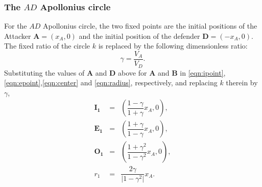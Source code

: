\documentclass{beamer}
\begin{document}
\begin{frame} 
\frametitle{The $AD$ Apollonius circle}
For the $AD$ Apollonius circle, the two fixed points are the initial positions of the Attacker $\boldsymbol{A}=(x_{A},0)$ and the initial position of the defender $\boldsymbol{D}=(-x_{A},0)$. The fixed ratio of the circle $k$ is replaced by the following dimensionless ratio: 
\begin{equation}
\gamma = \dfrac{V_{A}}{V_{D}}.
\end{equation}
Substituting the values of $\boldsymbol{A}$ and $\boldsymbol{D}$ above for $\boldsymbol{A}$ and $\boldsymbol{B}$ in \eqref{eqn:ipoint},\eqref{eqn:epoint},\eqref{eqn:center} and \eqref{eqn:radius}, respectively, and replacing $k$ therein by $\gamma$,
\begin{eqnarray}
\boldsymbol{I_{1}} &=& (\dfrac{1-\gamma}{1+\gamma}x_{A},0),\\
\boldsymbol{E_{1}} &=& (\dfrac{1+\gamma}{1-\gamma}x_{A},0),\\
\boldsymbol{O_{1}} &=& (\dfrac{1+\gamma^{2}}{1-\gamma^{2}}x_{A},0),\\
\label{O1}
r_{1} &=& \dfrac{2\gamma}{\lvert1-\gamma^{2}\rvert}x_{A}.
\label{r1}
\end{eqnarray}
\end{frame}
\end{document}
